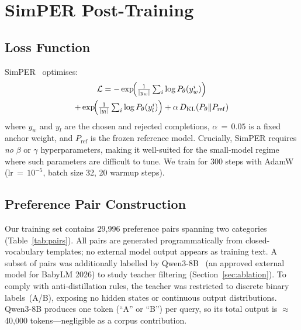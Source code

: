 \documentclass[11pt]{article}
\begin{document}
\section{SimPER Post-Training}
\label{sec:simper}

\subsection{Loss Function}

SimPER~\citep{simper2025} optimises:
\begin{multline}
\mathcal{L} = {-}\exp\!\Bigl(\tfrac{1}{|y_w|}\textstyle\sum_i \log P_\theta(y_w^i)\Bigr) \\
             + \exp\!\Bigl(\tfrac{1}{|y_l|}\textstyle\sum_i \log P_\theta(y_l^i)\Bigr)
             + \alpha\,D_{\mathrm{KL}}(P_\theta \| P_{\mathrm{ref}})
\label{eq:simper}
\end{multline}
where $y_w$ and $y_l$ are the chosen and rejected completions,
$\alpha\,{=}\,0.05$ is a fixed anchor weight,
and $P_{\mathrm{ref}}$ is the frozen reference model.
Crucially, SimPER requires \emph{no} $\beta$ or $\gamma$
hyperparameters,
making it well-suited for the small-model regime where
such parameters are difficult to tune.
We train for 300 steps with AdamW ($\text{lr}\,{=}\,10^{-5}$,
batch size 32, 20 warmup steps).

\subsection{Preference Pair Construction}
\label{sec:pairs}

Our training set contains 29{,}996 preference pairs
spanning two categories (Table~\ref{tab:pairs}).
All pairs are generated programmatically from closed-vocabulary
templates; no external model output appears as training text.
A subset of pairs was additionally labelled by Qwen3-8B~\citep{qwen3-2025}
(an approved external model for BabyLM 2026) to study teacher
filtering (Section~\ref{sec:ablation}).
To comply with anti-distillation rules, the teacher was restricted
to discrete binary labels~(A/B), exposing no hidden states or
continuous output distributions.
Qwen3-8B produces one token (``A'' or ``B'') per query,
so its total output is ${\approx}$40{,}000 tokens---negligible as a
corpus contribution.
\end{document}
